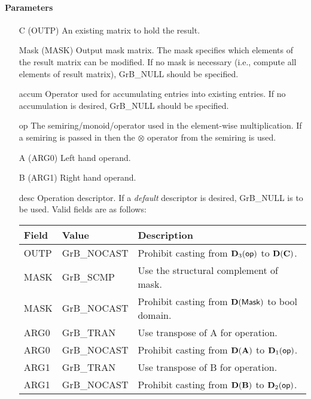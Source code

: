 \paragraph{Parameters}

\begin{itemize}[leftmargin=1.1in]
    \item[{\sf C}]     ({\sf OUTP}) An existing matrix to hold the result.

    \item[{\sf Mask}] ({\sf MASK}) Output mask matrix. The mask
    specifies which elements of the result matrix can be modified.
    If no mask is necessary (i.e., compute all elements of result
    matrix), {\sf GrB\_NULL} should be specified.

    \item[{\sf accum}]  Operator used for accumulating entries into existing
                         entries. If no accumulation is desired,
                        {\sf GrB\_NULL} should be specified.

    \item[{\sf op}]    The semiring/monoid/operator used in the element-wise multiplication.
                       If a semiring is passed in then the $\otimes$ operator from
                                    the semiring is used.
    \item[{\sf A}]     ({\sf ARG0}) Left hand operand.
    \item[{\sf B}]     ({\sf ARG1}) Right hand operand.
    
    \item[{\sf desc}]  Operation descriptor. If a
    \emph{default} descriptor is desired, {\sf GrB\_NULL} is to be
    used. Valid fields are as follows: \\
    \begin{tabular}{lll}
        Field  & Value & Description \\
        \hline
        {\sf OUTP} & {\sf GrB\_NOCAST} & Prohibit casting from $\bold{D}_3({\sf op})$ to $\bold{D}({\bf C})$. \\
        {\sf MASK} & {\sf GrB\_SCMP} & Use the structural complement of {\sf mask}. \\
    {\sf MASK} & {\sf GrB\_NOCAST} & Prohibit casting from $\bold{D}({\sf Mask})$ to {\sf bool} domain. \\
    {\sf ARG0} & {\sf GrB\_TRAN} & Use transpose of {\sf A} for operation. \\
        {\sf ARG0} & {\sf GrB\_NOCAST} & Prohibit casting from $\bold{D}({\bf A})$ to $\bold{D}_1({\sf op})$. \\
    {\sf ARG1} & {\sf GrB\_TRAN} & Use transpose of {\sf B} for operation. \\
        {\sf ARG1} & {\sf GrB\_NOCAST} & Prohibit casting from $\bold{D}({\bf B})$ to $\bold{D}_2({\sf op})$. \\
    \end{tabular}
\end{itemize}

